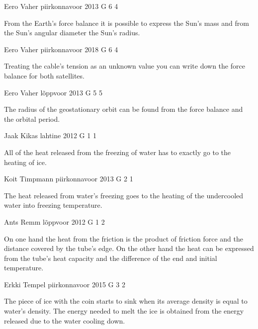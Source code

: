 \documentclass[11pt]{article}
\begin{document}
{Eero Vaher} %
{piirkonnavoor} %
{2013} %
{G 6} %
{4} %
{

\ifEngHint
From the Earth’s force balance it is possible to express the Sun’s mass and from the Sun’s angular diameter the Sun’s radius.
\fi
}

{Eero Vaher} %
{piirkonnavoor} %
{2018} %
{G 6} %
{4} %
{

\ifEngHint
Treating the cable’s tension as an unknown value you can write down the force balance for both satellites.
\fi
}

{Eero Vaher} %
{lõppvoor} %
{2013} %
{G 5} %
{5} %
{

\ifEngHint
The radius of the geostationary orbit can be found from the force balance and the orbital period.
\fi
}

{Jaak Kikas} %
{lahtine} %
{2012} %
{G 1} %
{1} %
{

\ifEngHint
All of the heat released from the freezing of water has to exactly go to the heating of ice.
\fi
}

{Koit Timpmann} %
{piirkonnavoor} %
{2013} %
{G 2} %
{1} %
{

\ifEngHint
The heat released from water’s freezing goes to the heating of the undercooled water into freezing temperature.
\fi
}

{Ants Remm} %
{lõppvoor} %
{2012} %
{G 1} %
{2} %
{

\ifEngHint
On one hand the heat from the friction is the product of friction force and the distance covered by the tube’s edge. On the other hand the heat can be expressed from the tube’s heat capacity and the difference of the end and initial temperature.
\fi
}

{Erkki Tempel} %
{piirkonnavoor} %
{2015} %
{G 3} %
{2} %
{

\ifEngHint
The piece of ice with the coin starts to sink when its average density is equal to water’s density. The energy needed to melt the ice is obtained from the energy released due to the water cooling down.
\fi
}
\end{document}
